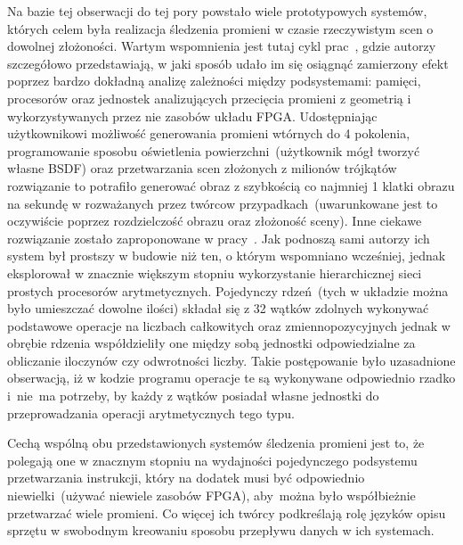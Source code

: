 Na bazie tej obserwacji do tej pory powstało wiele prototypowych systemów, których celem była realizacja śledzenia promieni w czasie rzeczywistym scen o dowolnej złożoności. Wartym wspomnienia jest tutaj cykl prac~\cite{Realtime_FPGA}\cite{RPU}\cite{Realtime_ASIC}, gdzie autorzy szczegółowo przedstawiają, w jaki sposób udało im się osiągnąć zamierzony efekt poprzez bardzo dokładną analizę zależności między podsystemami: pamięci, procesorów oraz jednostek analizujących przecięcia promieni z geometrią i wykorzystywanych przez nie zasobów układu FPGA. Udostępniając użytkownikowi możliwość generowania promieni wtórnych do 4 pokolenia, programowanie sposobu oświetlenia powierzchni~(użytkownik mógł tworzyć własne BSDF) oraz przetwarzania scen złożonych z milionów trójkątów rozwiązanie to potrafiło generować obraz z szybkością co najmniej 1 klatki obrazu na sekundę w rozważanych przez twórcow przypadkach~(uwarunkowane jest to oczywiście poprzez rozdzielczość obrazu oraz złożoność sceny). Inne ciekawe rozwiązanie zostało zaproponowane w pracy~\cite{TRAX}. Jak podnoszą sami autorzy ich system był prostszy w budowie niż ten, o którym wspomniano wcześniej, jednak eksplorował w znacznie większym stopniu wykorzystanie hierarchicznej sieci prostych procesorów arytmetycznych. Pojedynczy rdzeń~(tych w układzie można było umieszczać dowolne ilości) składał się z 32 wątków zdolnych wykonywać podstawowe operacje na liczbach całkowitych oraz zmiennopozycyjnych jednak w obrębie rdzenia współdzieliły one między sobą jednostki odpowiedzialne za obliczanie iloczynów czy odwrotności liczby. Takie postępowanie było uzasadnione obserwacją, iż w kodzie programu operacje te są wykonywane odpowiednio rzadko i~nie~ma potrzeby, by każdy z wątków posiadał własne jednostki do przeprowadzania operacji arytmetycznych tego typu.

Cechą wspólną obu przedstawionych systemów śledzenia promieni jest to, że polegają one w znacznym stopniu na wydajności pojedynczego podsystemu przetwarzania instrukcji, który na dodatek musi być odpowiednio niewielki~(używać niewiele zasobów FPGA), aby~można było współbieżnie przetwarzać wiele promieni. Co więcej ich twórcy podkreślają rolę języków opisu sprzętu w swobodnym kreowaniu sposobu przepływu danych w ich systemach.

